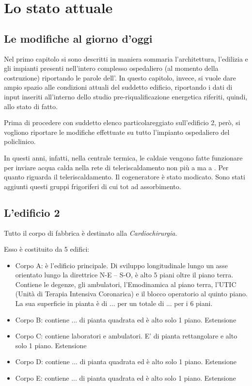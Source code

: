 \chapter{Lo stato attuale}
\thispagestyle{empty}
\section{Le modifiche al giorno d'oggi}
Nel primo capitolo si sono descritti in maniera sommaria l'architettura, l'edilizia e gli impianti presenti nell'intero complesso ospedaliero (al momento della costruzione) riportando le parole dell'. In questo capitolo, invece, si vuole dare ampio spazio alle condizioni attuali del suddetto edificio, riportando i dati di input inseriti all'interno dello studio pre-riqualificazione energetica riferiti, quindi, allo stato di fatto. 

Prima di procedere con suddetto elenco particolareggiato sull'edificio 2, però, si vogliono riportare le modifiche effettuate su tutto l'impianto ospedaliero del policlinico. 

In questi anni, infatti, nella centrale termica, le caldaie vengono fatte funzionare per inviare acqua calda nella rete di teleriscaldamento non più a  ma a . Per quanto riguarda il teleriscaldamento.
Il cogeneratore è stato modicato. Sono stati aggiunti questi gruppi frigoriferi di cui tot ad assorbimento.
\clearpage
\section{L'edificio 2}
Tutto il corpo di fabbrica è destinato alla \emph{Cardiochirurgia}.

Esso è costituito da 5 edifici:
\begin{itemize}
	\item Corpo A: è l'edificio principale. Di sviluppo longitudinale lungo un asse orientato lungo la direttrice N-E -- S-O, è alto 5 piani oltre il piano terra. Contiene le degenze, gli ambulatori, l'Emodinamica al piano terra, l'UTIC (Unità di Terapia Intensiva Coronarica) e il blocco operatorio al quinto piano. La sua superficie in pianta è di ... per un totale di ... per i 6 piani.
	\item Corpo B: contiene ... di pianta quadrata ed è alto solo 1 piano. Estensione
	\item Corpo C: contiene laboratori e ambulatori. E' di pianta rettangolare e alto solo 1 piano. Estensione
	\item Corpo D: contiene ... di pianta quadrata ed è alto solo 1 piano. Estensione
	\item Corpo E: contiene ... di pianta quadrata ed è alto solo 1 piano. Estensione
\end{itemize}

